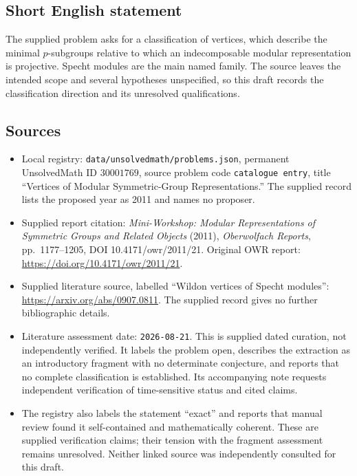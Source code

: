 \documentclass[11pt]{article}
\begin{document}
\subsection{Short English statement}
The supplied problem asks for a classification of vertices, which describe the minimal \(p\)-subgroups relative to which an indecomposable modular representation is projective. Specht modules are the main named family. The source leaves the intended scope and several hypotheses unspecified, so this draft records the classification direction and its unresolved qualifications.
\subsection{Sources}
\begin{itemize}
\item Local registry: \texttt{data/unsolvedmath/problems.json}, permanent UnsolvedMath ID \(30001769\), source problem code \texttt{catalogue entry}, title ``Vertices of Modular Symmetric-Group Representations.'' The supplied record lists the proposed year as 2011 and names no proposer.
\item Supplied report citation: \emph{Mini-Workshop: Modular Representations of Symmetric Groups and Related Objects} (2011), \emph{Oberwolfach Reports}, pp.\ 1177--1205, DOI 10.4171/owr/2011/21. Original OWR report: \url{https://doi.org/10.4171/owr/2011/21}.
\item Supplied literature source, labelled ``Wildon vertices of Specht modules'': \url{https://arxiv.org/abs/0907.0811}. The supplied record gives no further bibliographic details.
\item Literature assessment date: \texttt{2026-08-21}. This is supplied dated curation, not independently verified. It labels the problem open, describes the extraction as an introductory fragment with no determinate conjecture, and reports that no complete classification is established. Its accompanying note requests independent verification of time-sensitive status and cited claims.
\item The registry also labels the statement ``exact'' and reports that manual review found it self-contained and mathematically coherent. These are supplied verification claims; their tension with the fragment assessment remains unresolved. Neither linked source was independently consulted for this draft.
\end{itemize}
\end{document}
